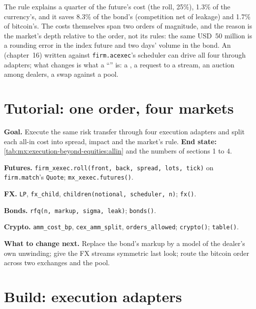 The rule explains a quarter of the future's cost (the roll, 25\%), 1.3\% of the currency's, and it saves 8.3\% of the bond's (competition net of
leakage) and 1.7\% of bitcoin's. The costs themselves span two orders of magnitude, and the reason is the market's depth relative to the order, not its
rules: the same USD~50 million is a rounding error in the index future and two days' volume in the bond. An 
(chapter~16) written against \texttt{firm.acexec}'s scheduler can drive all four through adapters; what changes is what a ``'' is: a
, a request to a stream, an auction among dealers, a swap against a pool.

\section{Tutorial: one order, four markets}\label{tut:mx:execution-beyond-equities:tut}

\begin{tutorial}
\textbf{Goal.} Execute the same risk transfer through four execution adapters and split each all-in cost into spread, impact and the market's rule.
\textbf{End state:} \cref{tab:mx:execution-beyond-equities:allin} and the numbers of sections 1 to 4.
\begin{tutsteps}
\item \textbf{Futures.} \texttt{firm\_xexec.roll(front, back, spread, lots, tick)} on \texttt{firm.match}'s \texttt{Quote}; \texttt{mx\_xexec.futures()}.
\item \textbf{FX.} \texttt{LP}, \texttt{fx\_child}, \texttt{children(notional, scheduler, n)}; \texttt{fx()}.
\item \textbf{Bonds.} \texttt{rfq(n, markup, sigma, leak)}; \texttt{bonds()}.
\item \textbf{Crypto.} \texttt{amm\_cost\_bp}, \texttt{cex\_amm\_split}, \texttt{orders\_allowed}; \texttt{crypto()}; \texttt{table()}.
\end{tutsteps}
\textbf{What to change next.} Replace the bond's markup by a model of the dealer's own unwinding; give the FX streams symmetric last look; route the
bitcoin order across two exchanges and the pool.
\end{tutorial}

\section{Build: execution adapters}\label{bld:mx:execution-beyond-equities:xexec}

